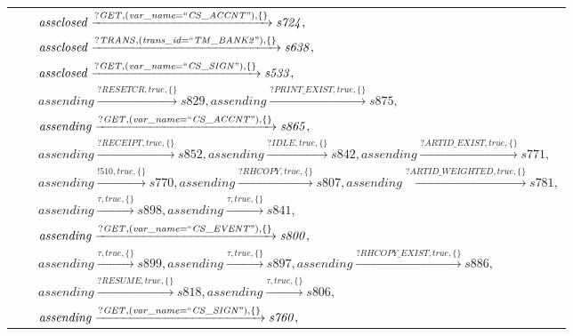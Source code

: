 \begin{tabular}{lcp{350px}}
& & $\mathit{assclosed}\xrightarrow{\mathit{?GET}, \mathit{(var\_name = ``CS\_ACCNT")}, \{\}}\mathit{s724},$ \\
& & $\mathit{assclosed}\xrightarrow{\mathit{?TRANS}, \mathit{(trans\_id = ``TM\_BANK2")}, \{\}}\mathit{s638},$ \\
& & $\mathit{assclosed}\xrightarrow{\mathit{?GET}, \mathit{(var\_name = ``CS\_SIGN")}, \{\}}\mathit{s533},$ \\
& & $\mathit{assending}\xrightarrow{\mathit{?RESETCR}, \mathit{true}, \{\}}\mathit{s829},\mathit{assending}\xrightarrow{\mathit{?PRINT\_EXIST}, \mathit{true}, \{\}}\mathit{s875},$ \\
& & $\mathit{assending}\xrightarrow{\mathit{?GET}, \mathit{(var\_name = ``CS\_ACCNT")}, \{\}}\mathit{s865},$ \\
& & $\mathit{assending}\xrightarrow{\mathit{?RECEIPT}, \mathit{true}, \{\}}\mathit{s852},\mathit{assending}\xrightarrow{\mathit{?IDLE}, \mathit{true}, \{\}}\mathit{s842},\mathit{assending}\xrightarrow{\mathit{?ARTID\_EXIST}, \mathit{true}, \{\}}\mathit{s771},$ \\
& & $\mathit{assending}\xrightarrow{\mathit{!510}, \mathit{true}, \{\}}\mathit{s770},\mathit{assending}\xrightarrow{\mathit{?RHCOPY}, \mathit{true}, \{\}}\mathit{s807},\mathit{assending}\xrightarrow{\mathit{?ARTID\_WEIGHTED}, \mathit{true}, \{\}}\mathit{s781},$ \\
& & $\mathit{assending}\xrightarrow{\mathit{\tau}, \mathit{true}, \{\}}\mathit{s898},\mathit{assending}\xrightarrow{\mathit{\tau}, \mathit{true}, \{\}}\mathit{s841},$ \\
& & $\mathit{assending}\xrightarrow{\mathit{?GET}, \mathit{(var\_name = ``CS\_EVENT")}, \{\}}\mathit{s800},$ \\
& & $\mathit{assending}\xrightarrow{\mathit{\tau}, \mathit{true}, \{\}}\mathit{s899},\mathit{assending}\xrightarrow{\mathit{\tau}, \mathit{true}, \{\}}\mathit{s897},\mathit{assending}\xrightarrow{\mathit{?RHCOPY\_EXIST}, \mathit{true}, \{\}}\mathit{s886},$ \\
& & $\mathit{assending}\xrightarrow{\mathit{?RESUME}, \mathit{true}, \{\}}\mathit{s818},\mathit{assending}\xrightarrow{\mathit{\tau}, \mathit{true}, \{\}}\mathit{s806},$ \\
& & $\mathit{assending}\xrightarrow{\mathit{?GET}, \mathit{(var\_name = ``CS\_SIGN")}, \{\}}\mathit{s760},$ \\
\end{tabular}

